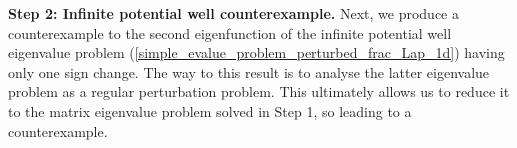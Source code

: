 \documentclass[preprint,12pt]{elsarticle}
\newcommand{\M}{\mathbf{M}}
\begin{document}
\textbf{Step 2: Infinite potential well counterexample.} Next, we produce a counterexample to the second eigenfunction of the infinite potential well eigenvalue problem (\ref{simple_evalue_problem_perturbed_frac_Lap_1d}) having only one sign change. The way to this result is to analyse the latter eigenvalue problem as a regular perturbation problem. This ultimately allows us to reduce it to the matrix eigenvalue problem solved in Step 1, so leading to a counterexample.\\
\end{document}
